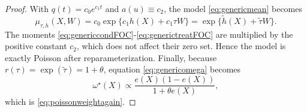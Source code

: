 \documentclass[11pt]{article}
\newtheorem{remark}[theorem]{Remark}
\newcommand{\1}{\mathbf{1}}
\begin{document}
\begin{proof}
With $q(t)=c_0e^{c_1 t}$ and $a(u)\equiv c_2$, the model \eqref{eq:genericmean} becomes
\[
\mu_{\tau,h}(X,W)
=
c_0\exp\{c_1 h(X)+c_1\tau W\}
=\exp\{\tilde h(X)+\tilde\tau W\}.
\]
The moments \eqref{eq:genericcondFOC}-\eqref{eq:generictreatFOC} are multiplied by the positive constant $c_2$, which does not affect their zero set. Hence the model is exactly Poisson after reparameterization. Finally, because $r(\tau)=\exp(\tilde\tau)=1+\theta$, equation \eqref{eq:genericomega} becomes
\[
\omega^\star(X)
\propto
\frac{e(X)(1-e(X))}{1+\theta e(X)},
\]
which is \eqref{eq:poissonweightagain}.
\end{proof}

\end{document}
